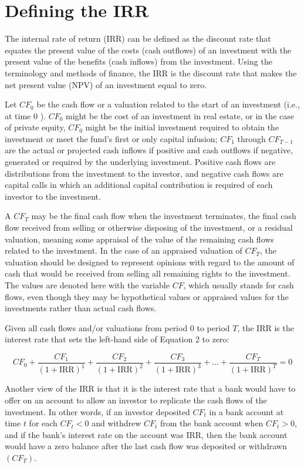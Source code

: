 \documentclass[11pt]{article}
\begin{document}
\section*{Defining the IRR}
The internal rate of return (IRR) can be defined as the discount rate that equates the present value of the costs (cash outflows) of an investment with the present value of the benefits (cash inflows) from the investment. Using the terminology and methods of finance, the IRR is the discount rate that makes the net present value (NPV) of an investment equal to zero.

Let $C F_{0}$ be the cash flow or a valuation related to the start of an investment (i.e., at time 0 ). $C F_{0}$ might be the cost of an investment in real estate, or in the case of private equity, $C F_{0}$ might be the initial investment required to obtain the investment or meet the fund's first or only capital infusion; $C F_{1}$ through $C F_{T-1}$ are the actual or projected cash inflows if positive and cash outflows if negative, generated or required by the underlying investment. Positive cash flows are distributions from the investment to the investor, and negative cash flows are capital calls in which an additional capital contribution is required of each investor to the investment.

A $C F_{T}$ may be the final cash flow when the investment terminates, the final cash flow received from selling or otherwise disposing of the investment, or a residual valuation, meaning some appraisal of the value of the remaining cash flows related to the investment. In the case of an appraised valuation of $C F_{T}$, the valuation should be designed to represent opinions with regard to the amount of cash that would be received from selling all remaining rights to the investment. The values are denoted here with the variable $C F$, which usually stands for cash flows, even though they may be hypothetical values or appraised values for the investments rather than actual cash flows.

Given all cash flows and/or valuations from period 0 to period $T$, the IRR is the interest rate that sets the left-hand side of Equation 2 to zero:


\begin{equation*}
C F_{0}+\frac{C F_{1}}{(1+\mathrm{IRR})^{1}}+\frac{C F_{2}}{(1+\mathrm{IRR})^{2}}+\frac{C F_{3}}{(1+\mathrm{IRR})^{3}}+\ldots+\frac{C F_{T}}{(1+\mathrm{IRR})^{T}}=0 \tag{2}
\end{equation*}


Another view of the IRR is that it is the interest rate that a bank would have to offer on an account to allow an investor to replicate the cash flows of the investment. In other words, if an investor deposited $C F_{t}$ in a bank account at time $t$ for each $C F_{t}<0$ and withdrew $C F_{t}$ from the bank account when $C F_{t}>0$, and if the bank's interest rate on the account was IRR, then the bank account would have a zero balance after the last cash flow was deposited or withdrawn $\left(C F_{T}\right)$.
\end{document}

